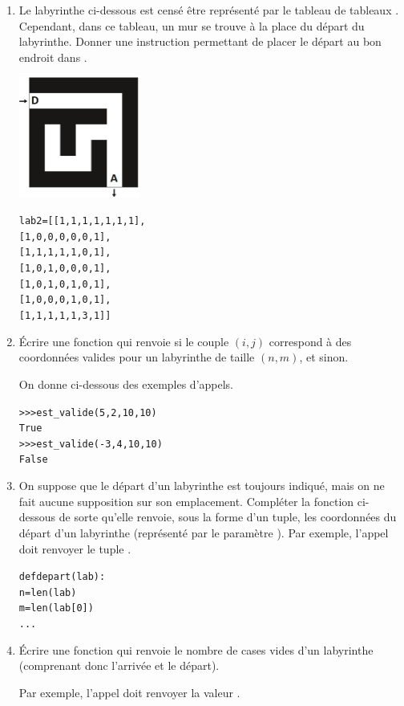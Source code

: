 \documentclass[11pt,a4paper,french,twoside]{PMCours}
\begin{document}
\begin{enumerate}
\item Le labyrinthe ci-dessous est censé être représenté par le tableau de tableaux .
Cependant, dans ce tableau, un mur se trouve à la place du départ du labyrinthe.
Donner une instruction permettant de placer le départ au bon endroit dans .
\begin{multicols}{2}
    \includegraphics[width=4cm]{BacBlanc2Sujet1_NSI2122-img2.png}

\begin{alltt}
lab2 = [[1, 1, 1, 1, 1, 1, 1],
        [1, 0, 0, 0, 0, 0, 1],
        [1, 1, 1, 1, 1, 0, 1],
        [1, 0, 1, 0, 0, 0, 1],
        [1, 0, 1, 0, 1, 0, 1],
        [1, 0, 0, 0, 1, 0, 1],
        [1, 1, 1, 1, 1, 3, 1]]
\end{alltt}
\end{multicols}
\item Écrire une fonction  qui renvoie  si le couple $(i,j)$
correspond à des coordonnées valides pour un labyrinthe de taille $(n,m)$, et  sinon.

On donne ci-dessous des exemples d'appels.
\begin{alltt}
>>> est\_valide(5, 2, 10, 10)
True
>>> est\_valide(-3, 4, 10, 10)
False
\end{alltt}
\item On suppose que le départ d'un labyrinthe est toujours indiqué, mais on ne fait aucune
supposition sur son emplacement. Compléter la fonction  ci-dessous de sorte
qu'elle renvoie, sous la forme d'un tuple, les coordonnées du départ d'un labyrinthe
(représenté par le paramètre ). Par exemple, l'appel  doit renvoyer le
tuple .
\begin{alltt}
def depart(lab) :
    n = len(lab)
    m = len(lab[0])
...
\end{alltt}
\item Écrire une fonction  qui renvoie le nombre de cases vides d'un
labyrinthe (comprenant donc l'arrivée et le départ).

Par exemple, l'appel  doit renvoyer la valeur .
\end{enumerate}
\end{document}
